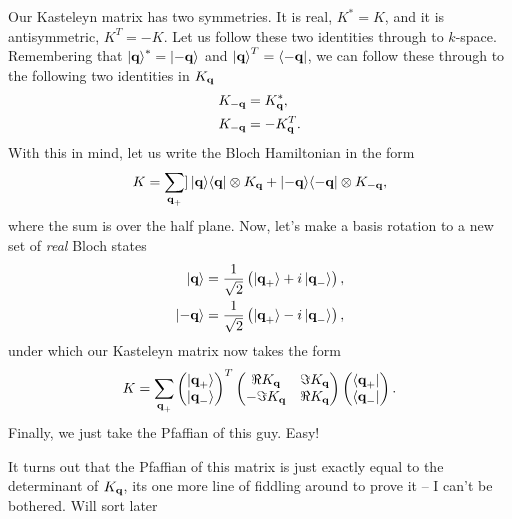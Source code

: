 \documentclass[11pt, oneside]{article} %
\numberwithin{equation}{section}
\begin{document}
Our Kasteleyn matrix has two symmetries. It is real, $K^* = K$, and it is antisymmetric, $K^T = -K$. Let us follow these two identities through to $k$-space. Remembering that $\ket {\textbf q}^* = \ket {-\textbf q}$ and $\ket {\textbf q}^T = \bra {-\textbf q}$, we can follow these through to the following two identities in $K_{\textbf q}$
\begin{align}
    K_{-\textbf q} &= K_{\textbf q}^*, \\
    K_{-\textbf q} &= -K_{\textbf q}^T.
\end{align}
With this in mind, let us write the Bloch Hamiltonian in the form
\begin{align}
    K = \sum_{\textbf q_+}]
    \ket{\textbf q}\!\bra{\textbf q} \otimes K_{\textbf q} + \ket{-\textbf q}\!\bra{-\textbf q} \otimes K_{-\textbf q},
\end{align}
where the sum is over the half plane.
Now, let's make a basis rotation to a new set of \textit{real} Bloch states
\begin{align}
    \ket{\textbf q} = \frac 1{\sqrt 2} \left (
        \ket{\textbf q_+} + i\ket { \textbf q_-}
    \right ),\\
    \ket{-\textbf q} = \frac 1{\sqrt 2} \left (
        \ket{\textbf q_+} - i\ket { \textbf q_-}
    \right ),
\end{align}
under which our Kasteleyn matrix now takes the form
\begin{align}
    K = \sum_{\textbf q_+} \begin{pmatrix}
        \ket{\textbf q_+} \\
        \ket{\textbf q_-} 
    \end{pmatrix}^T
    \begin{pmatrix}
            \Re K_{\textbf q} &\Im K_{\textbf q} \\
            -\Im K_{\textbf q} & \Re K_{\textbf q}
    \end{pmatrix}
    \begin{pmatrix}
        \bra{\textbf q_+} \\
        \bra{\textbf q_-} 
    \end{pmatrix}.
\end{align}
Finally, we just take the Pfaffian of this guy. Easy!
\begin{shaded}
    It turns out that the Pfaffian of this matrix is just exactly equal to the determinant of $K_{\textbf q}$, its one more line of fiddling around to prove it -- I can't be bothered. Will sort later
\end{shaded}

\end{document}
